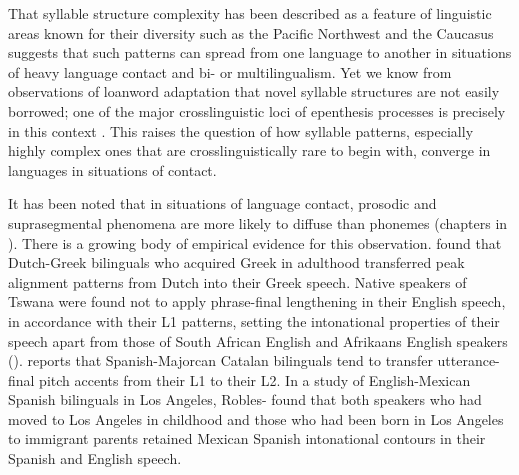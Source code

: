   That syllable structure complexity has been described as a feature of linguistic areas known for their diversity such as the Pacific Northwest and the Caucasus suggests that such patterns can spread from one language to another in situations of heavy language contact and bi- or multilingualism. Yet we know from observations of loanword adaptation that novel syllable structures are not easily borrowed; one of the major crosslinguistic loci of epenthesis processes is precisely in this context \citep{Hall2011}. This raises the question of how syllable patterns, especially highly complex ones that are crosslinguistically rare to begin with, converge in languages in situations of contact.



  It has been noted that in situations of language contact, prosodic and suprasegmental phenomena are more likely to diffuse than phonemes (chapters in \citealt{AikhenvaldDixon2001b}). There is a growing body of empirical evidence for this observation. \citet{Mennen2004} found that Dutch-Greek bilinguals who acquired Greek in adulthood transferred peak alignment patterns from Dutch into their Greek speech. Native speakers of Tswana were found not to apply phrase-final lengthening in their English speech, in accordance with their L1 patterns, setting the intonational properties of their speech apart from those of South African English and Afrikaans English speakers (\citealt{CoetzeeWissing2007}). \citet{Simonet2011} reports that Spanish-Majorcan Catalan bilinguals tend to transfer utterance-final pitch accents from their L1 to their L2. In a study of English-Mexican Spanish bilinguals in Los Angeles, Robles-\citet{Puente2014} found that both speakers who had moved to Los Angeles in childhood and those who had been born in Los Angeles to immigrant parents retained Mexican Spanish intonational contours in their Spanish and English speech.



